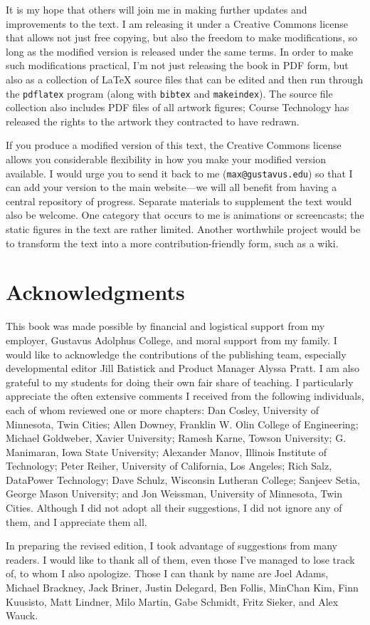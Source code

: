 It is my hope that others will join me in making further updates and improvements to the text.  I am releasing it under a Creative Commons license that allows not just free copying, but also the freedom to make modifications, so long as the modified version is released under the same terms.  In order to make such modifications practical, I'm not just releasing the book in PDF form, but also as a collection of LaTeX source files that can be edited and then run through the \texttt{pdflatex} program (along with \texttt{bibtex} and \texttt{makeindex}).  The source file collection also includes PDF files of all artwork figures; Course Technology has released the rights to the artwork they contracted to have redrawn.

If you produce a modified version of this text, the Creative Commons license allows you considerable flexibility in how you make your modified version available.  I would urge you to send it back to me (\verb|max@gustavus.edu|) so that I can add your version to the main website---we will all benefit from having a central repository of progress.  Separate materials to supplement the text would also be welcome.  One category that occurs to me is animations or screencasts; the static figures in the text are rather limited. Another worthwhile project would be to transform the text into a more contribution-friendly form, such as a wiki.

\section*{Acknowledgments}

This book was made possible by financial and logistical support from
my employer, Gustavus Adolphus College, and moral support from my
family.  I would like to acknowledge the contributions of the
publishing team, especially developmental editor Jill Batistick and
Product Manager Alyssa Pratt.  I am also grateful to my students for
doing their own fair share of teaching.  I particularly appreciate the
often extensive comments I received from the following individuals,
each of whom reviewed one or more chapters: Dan Cosley, University of
Minnesota, Twin Cities; Allen Downey, Franklin W. Olin College of
Engineering; Michael Goldweber, Xavier University; Ramesh Karne,
Towson University; G. Manimaran, Iowa State University; Alexander
Manov, Illinois Institute of Technology; Peter Reiher, University of
California, Los Angeles; Rich Salz, DataPower Technology; Dave Schulz,
Wisconsin Lutheran College; Sanjeev Setia, George Mason University;
and Jon Weissman, University of Minnesota, Twin Cities.  Although I
did not adopt all their suggestions, I did not ignore any of them, and
I appreciate them all.

In preparing the revised edition, I took advantage of suggestions from many readers.  I would like to thank all of them, even those I've managed to lose track of, to whom I also apologize.  Those I can thank by name are Joel Adams, Michael Brackney, Jack Briner, Justin Delegard, Ben Follis, MinChan Kim, Finn Kuusisto, Matt Lindner, Milo Martin, Gabe Schmidt, Fritz Sieker, and Alex Wauck.
